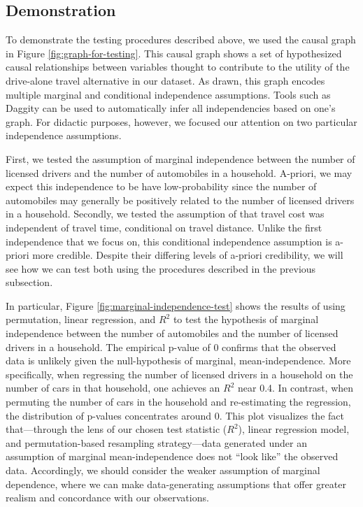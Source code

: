 \subsection{Demonstration}
To demonstrate the testing procedures described above, we used the causal graph in Figure \ref{fig:graph-for-testing}.
This causal graph shows a set of hypothesized causal relationships between variables thought to contribute to the utility of the drive-alone travel alternative in our dataset.
As drawn, this graph encodes multiple marginal and conditional independence assumptions.
Tools such as Daggity \citep{textor_2016_robust} can be used to automatically infer all independencies based on one's graph.
For didactic purposes, however, we focused our attention on two particular independence assumptions.

First, we tested the assumption of marginal independence between the number of licensed drivers and the number of automobiles in a household.
A-priori, we may expect this independence to be have low-probability since the number of automobiles may generally be positively related to the number of licensed drivers in a household.
Secondly, we tested the assumption of that travel cost was independent of travel time, conditional on travel distance.
Unlike the first independence that we focus on, this conditional independence assumption is a-priori more credible.
Despite their differing levels of a-priori credibility, we will see how we can test both using the procedures described in the previous subsection.


In particular, Figure \ref{fig:marginal-independence-test} shows the results of using permutation, linear regression, and $R^2$ to test the hypothesis of marginal independence between the number of automobiles and the number of licensed drivers in a household.
The empirical p-value of 0 confirms that the observed data is unlikely given the null-hypothesis of marginal, mean-independence.
More specifically, when regressing the number of licensed drivers in a household on the number of cars in that household, one achieves an $R^2$ near 0.4.
In contrast, when permuting the number of cars in the household and re-estimating the regression, the distribution of p-values concentrates around 0.
This plot visualizes the fact that---through the lens of our chosen test statistic ($R^2$), linear regression model, and permutation-based resampling strategy---data generated under an assumption of marginal mean-independence does not ``look like'' the observed data.
Accordingly, we should consider the weaker assumption of marginal dependence, where we can make data-generating assumptions that offer greater realism and concordance with our observations.

